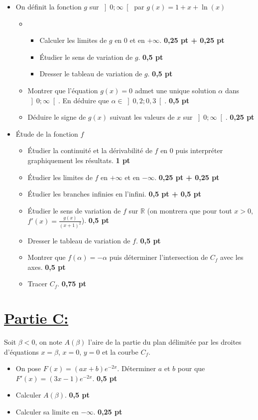 \documentclass[12pt]{article}
\begin{document}
\begin{itemize}
    \item[I.] On définit la fonction $g$ sur $\left]0 ; \infty\right[$ par $g(x) = 1 + x + \ln(x)$
    \begin{itemize}
        \item[1.] 
        \begin{itemize}
            \item[a)] Calculer les limites de $g$ en 0 et en $+\infty$. \textbf{0,25 pt + 0,25 pt}
            \item[b)] Étudier le sens de variation de $g$. \textbf{0,5 pt}
            \item[c)] Dresser le tableau de variation de $g$. \textbf{0,5 pt}
        \end{itemize}
        \item[2.] Montrer que l'équation $g(x) = 0$ admet une unique solution $\alpha$ dans $\left]0 ; \infty\right[$. En déduire que $\alpha \in \left]0,2 ; 0,3\right[$. \textbf{0,5 pt}
        \item[3.] Déduire le signe de $g(x)$ suivant les valeurs de $x$ sur $\left]0 ; \infty\right[$. \textbf{0,25 pt}
    \end{itemize}
    \item[II.] Étude de la fonction $f$
    \begin{itemize}
        \item[1.] Étudier la continuité et la dérivabilité de $f$ en 0 puis interpréter graphiquement les résultats. \textbf{1 pt}
        \item[2.] Étudier les limites de $f$ en $+\infty$ et en $-\infty$. \textbf{0,25 pt + 0,25 pt}
        \item[3.] Étudier les branches infinies en l'infini. \textbf{0,5 pt + 0,5 pt}
        \item[4.] Étudier le sens de variation de $f$ sur $\mathbb{R}$ (on montrera que pour tout $x > 0$, $f'(x) = \frac{g(x)}{(x + 1)^{2}}$). \textbf{0,5 pt}
        \item[5.] Dresser le tableau de variation de $f$. \textbf{0,5 pt}
        \item[6.] Montrer que $f(\alpha) = -\alpha$ puis déterminer l'intersection de $C_f$ avec les axes. \textbf{0,5 pt}
        \item[7.] Tracer $C_f$. \textbf{0,75 pt}
    \end{itemize}
\end{itemize}
\section*{\underline{Partie C:}}
Soit $\beta < 0$, on note $A(\beta)$ l'aire de la partie du plan délimitée par les droites d'équations $x = \beta$, $x = 0$, $y = 0$ et la courbe $C_f$.

\begin{itemize}
    \item[1.] On pose $F(x) = (ax + b)e^{-2x}$. Déterminer $a$ et $b$ pour que $F'(x) = (3x - 1)e^{-2x}$. \textbf{0,5 pt}
    \item[2.] Calculer $A(\beta)$. \textbf{0,5 pt}
    \item[3.] Calculer sa limite en $-\infty$. \textbf{0,25 pt}
\end{itemize}
\end{document}
